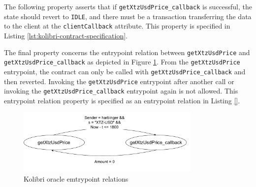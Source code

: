 \documentclass[a4paper,UKenglish,cleveref, autoref, thm-restate]{lipics-v2021}
\begin{document}
The following property asserts that if \lstinline/getXtzUsdPrice_callback/ is successful, the state should revert to \lstinline/IDLE/, and there must be a transaction transferring the data to the client at the \lstinline/clientCallback/ attribute. This property is specified in Listing \ref{lst:kolibri-contract-specification}.

The final property concerns the entrypoint relation between \lstinline/getXtzUsdPrice/ and \lstinline/getXtzUsdPrice_callback/ as depicted in Figure \ref{fig:kolibri-oracle-emtrypoint-relations}. From the \lstinline/getXtzUsdPrice/ entrypoint, the contract can only be called with \lstinline/getXtzUsdPrice_callback/ and then reverted. Invoking the \lstinline/getXtzUsdPrice/ entrypoint after another call or invoking the \lstinline/getXtzUsdPrice_callback/ entrypoint again is not allowed. This entrypoint relation property is specified as an entrypoint relation in Listing \ref{}.

\begin{figure}[h]
    \centering
    \includegraphics[width=0.8\textwidth]{kolibri}
    \caption{Kolibri oracle emtrypoint relations}
    \label{fig:kolibri-oracle-emtrypoint-relations}
\end{figure}
\end{document}

